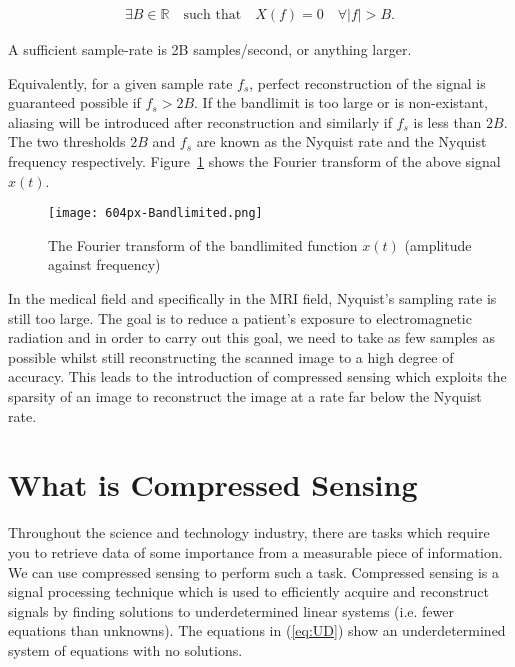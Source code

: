 \documentclass[titlepage,oneside, 12pt]{book}
\theoremstyle{break}
\begin{document}
\begin{gather}
\exists B \in \mathbb{R} \quad \textrm{such that} \quad X(f) = 0 \quad \forall |f| > B.
\end{gather}

A sufficient sample-rate is 2B samples/second, or anything larger.

\newpage

 Equivalently, for a given sample rate $f_s$, perfect reconstruction of the signal is guaranteed possible if $f_s > 2B$.  If the bandlimit is too large or is non-existant, aliasing will be introduced after reconstruction and similarly if $f_s$ is less than $2B$. The two thresholds $2B$ and $f_s$ are known as the Nyquist rate and the Nyquist frequency respectively. Figure~\ref{fig:Fex}  shows the Fourier transform of the above signal $x(t)$. 

\begin{figure}[H]
\centering
\texttt{[image: 604px-Bandlimited.png]}\caption{The Fourier transform of the bandlimited function $x(t)$ (amplitude against frequency)\cite{NyquistWiki}}
\label{fig:Fex}
\end{figure}

In the medical field and specifically in the MRI field, Nyquist's sampling rate is still too large. The goal is to reduce a patient's exposure to electromagnetic radiation and in order to carry out this goal, we need to take as few samples as possible whilst still reconstructing the scanned image to a high degree of accuracy. This leads to the introduction of compressed sensing which exploits the sparsity of an image to reconstruct the image at a rate far below the Nyquist rate. 

\newpage





\section{What is Compressed Sensing}

Throughout the science and technology industry, there are tasks which require you to retrieve data of some importance from a measurable piece of information. We can use compressed sensing to perform such a task.    
Compressed sensing is a signal processing technique which is used to efficiently acquire and reconstruct signals by finding solutions to underdetermined linear systems (i.e. fewer equations than unknowns)\cite{Wikipedia}. The equations in (\ref{eq:UD}) show an underdetermined system of equations with no solutions.  
\end{document}
